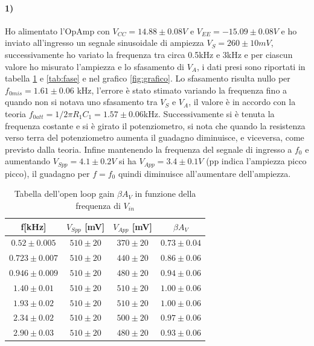 \documentclass{article}
\begin{document}
	\paragraph{1)}
	Ho alimentato l'OpAmp con $V_{CC}=14.88\pm0.08V$ e $V_{EE}=-15.09\pm0.08V$ e ho inviato all'ingresso un segnale sinusoidale di ampiezza $V_S=260\pm10 mV$, successivamente ho variato la frequenza tra circa 0.5kHz e 3kHz e per ciascun valore ho misurato l'ampiezza e lo sfasamento di $V_A$, i dati presi sono riportati in tabella \ref{tab:guadagno} e \ref{tab:fase} e nel grafico \ref{fig:grafico}.
	Lo sfasamento risulta nullo per $f_{0mis}=1.61\pm0.06$ kHz, l'errore è stato stimato variando la frequenza fino a quando non si notava uno sfasamento tra $V_S$ e $V_A$, il valore è in accordo con la teoria $f_{0att}=1/2\pi R_1 C_1 = 1.57\pm0.06$kHz. Successivamente si è tenuta la frequenza costante e si è girato il potenziometro, si nota che quando la resistenza verso terra del potenziometro aumenta il guadagno diminuisce, e viceversa, come previsto dalla teoria. Infine mantenendo la frequenza del segnale di ingresso a $f_0$ e aumentando $V_{Spp}=4.1\pm0.2V$ si ha $V_{App} = 3.4\pm0.1V$ (pp indica l'ampiezza picco picco), il guadagno per $f=f_0$ quindi diminuisce all'aumentare dell'ampiezza.
	
	
	\begin{table}
	\centering
	\begin{tabular}{cccc}
		\hline
		f[kHz]&$V_{Spp}$ [mV]&$V_{App}$ [mV]&$\beta A_V$\\
		\hline
		$0.52\pm0.005$ & $510\pm20$ & $370\pm20$ & $0.73\pm0.04$ \\
		$0.723\pm0.007$ & $510\pm20$ & $440\pm20$ & $0.86\pm0.06$ \\
		$0.946\pm0.009$ & $510\pm20$ & $480\pm20$ & $0.94\pm0.06$ \\
		$1.40\pm0.01$ & $510\pm20$ & $510\pm20$ & $1.00\pm0.06$ \\
		$1.93\pm0.02$ & $510\pm20$ & $510\pm20$ & $1.00\pm0.06$ \\
		$2.34\pm0.02$ & $510\pm20$ & $500\pm20$ & $0.97\pm0.06$ \\
		$2.90\pm0.03$ & $510\pm20$ & $480\pm20$ & $0.93\pm0.06$ \\
	\end{tabular}
	\caption{Tabella dell'open loop gain $\beta A_V$ in funzione della frequenza di $V_{in}$}
	\label{tab:guadagno}
	\end{table}
\end{document}
